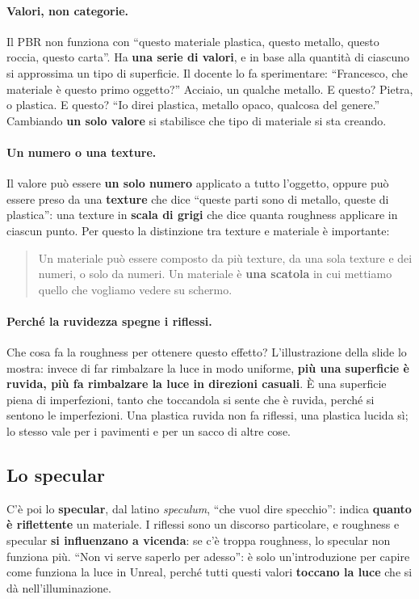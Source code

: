 \paragraph{Valori, non categorie.} Il PBR non funziona con ``questo materiale
plastica, questo metallo, questo roccia, questo carta''. Ha \textbf{una serie di
valori}, e in base alla quantità di ciascuno si approssima un tipo di superficie.
Il docente lo fa sperimentare: ``Francesco, che materiale è questo primo oggetto?''
Acciaio, un qualche metallo. E questo? Pietra, o plastica. E questo? ``Io direi
plastica, metallo opaco, qualcosa del genere.'' Cambiando \textbf{un solo valore}
si stabilisce che tipo di materiale si sta creando.

\paragraph{Un numero o una texture.} Il valore può essere \textbf{un solo numero}
applicato a tutto l'oggetto, oppure può essere preso da una \textbf{texture} che
dice ``queste parti sono di metallo, queste di plastica'': una texture in
\textbf{scala di grigi} che dice quanta roughness applicare in ciascun punto. Per
questo la distinzione tra texture e materiale è importante:
\begin{quote}
Un materiale può essere composto da più texture, da una sola texture e dei numeri,
o solo da numeri. Un materiale è \textbf{una scatola} in cui mettiamo quello che
vogliamo vedere su schermo.
\end{quote}

\paragraph{Perché la ruvidezza spegne i riflessi.} Che cosa fa la roughness per
ottenere questo effetto? L'illustrazione della slide lo mostra: invece di far
rimbalzare la luce in modo uniforme, \textbf{più una superficie è ruvida, più fa
rimbalzare la luce in direzioni casuali}. È una superficie piena di imperfezioni,
tanto che toccandola si sente che è ruvida, perché si sentono le imperfezioni. Una
plastica ruvida non fa riflessi, una plastica lucida sì; lo stesso vale per i
pavimenti e per un sacco di altre cose.

\subsection{Lo specular}

C'è poi lo \textbf{specular}, dal latino \emph{speculum}, ``che vuol dire
specchio'': indica \textbf{quanto è riflettente} un materiale. I riflessi sono un
discorso particolare, e roughness e specular \textbf{si influenzano a vicenda}: se
c'è troppa roughness, lo specular non funziona più. ``Non vi serve saperlo per
adesso'': è solo un'introduzione per capire come funziona la luce in Unreal,
perché tutti questi valori \textbf{toccano la luce} che si dà nell'illuminazione.

